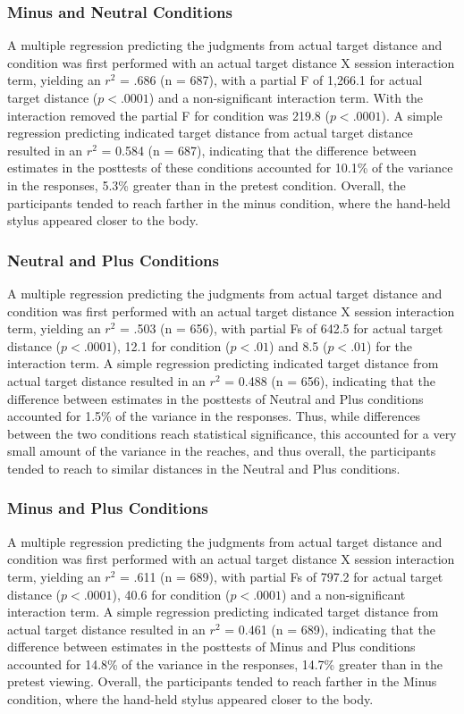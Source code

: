 \subsubsection{Minus and Neutral Conditions}
A multiple regression predicting the judgments from actual target distance and condition was first performed with an actual target distance X session interaction term, yielding an $r^2$ = .686 (n = 687), with a partial F of 1,266.1 for actual target distance ($p < .0001$) and a non-significant interaction term. With the interaction removed the partial F for condition was 219.8 ($p < .0001$). A simple regression predicting indicated target distance from actual target distance resulted in an $r^2$ = 0.584 (n = 687), indicating that the difference between estimates in the posttests of these conditions accounted for 10.1\% of the variance in the responses, 5.3\% greater than in the pretest condition. Overall, the participants tended to reach farther in the minus condition, where the hand-held stylus appeared closer to the body.

\subsubsection{Neutral and Plus Conditions}

A multiple regression predicting the judgments from actual target distance and condition was first performed with an actual target distance X session interaction term, yielding an $r^2$ = .503 (n = 656), with partial Fs of 642.5 for actual target distance ($p < .0001$), 12.1 for condition ($p < .01$) and 8.5 ($p < .01$) for the interaction term. A simple regression predicting indicated target distance from actual target distance resulted in an $r^2$ = 0.488 (n = 656), indicating that the difference between estimates in the posttests of Neutral and Plus conditions accounted for 1.5\% of the variance in the responses. Thus, while differences between the two conditions reach statistical significance, this accounted for a very small amount of the variance in the reaches, and thus overall, the participants tended to reach to similar distances in the Neutral and Plus conditions.

\subsubsection{Minus and Plus Conditions}
A multiple regression predicting the judgments from actual target distance and condition was first performed with an actual target distance X session interaction term, yielding an $r^2$ = .611 (n = 689), with partial Fs of 797.2 for actual target distance ($p < .0001$), 40.6 for condition ($p < .0001$) and a non-significant interaction term. A simple regression predicting indicated target distance from actual target distance resulted in an $r^2$ = 0.461 (n = 689), indicating that the difference between estimates in the posttests of Minus and Plus conditions accounted for 14.8\% of the variance in the responses, 14.7\% greater than in the pretest viewing. Overall, the participants tended to reach farther in the Minus condition, where the hand-held stylus appeared closer to the body.

